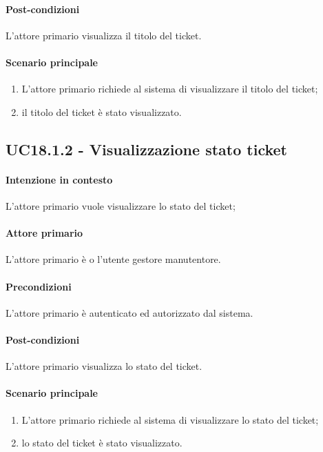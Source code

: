 \paragraph{Post-condizioni} L'attore primario visualizza il titolo del ticket.
\paragraph{Scenario principale}
\begin{enumerate}
    \item L'attore primario richiede al sistema di visualizzare il titolo del ticket;
    \item il titolo del ticket è stato visualizzato.
\end{enumerate}

\subsection{UC18.1.2 - Visualizzazione stato ticket}\label{uc:18.1.2}

\paragraph{Intenzione in contesto} L'attore primario vuole visualizzare lo stato del ticket;
\paragraph{Attore primario} L'attore primario è o l'utente gestore manutentore.
\paragraph{Precondizioni}  L'attore primario è autenticato ed autorizzato dal sistema.
\paragraph{Post-condizioni} L'attore primario visualizza lo stato del ticket.
\paragraph{Scenario principale}
\begin{enumerate}
    \item L'attore primario richiede al sistema di visualizzare lo stato del ticket;
    \item lo stato del ticket è stato visualizzato.
\end{enumerate}
